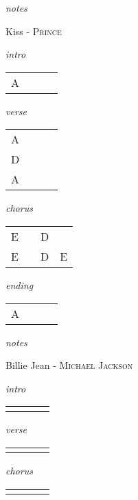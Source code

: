 \documentclass[12pt]{article}
\begin{document}
\textit{notes}

\newpage

{\Huge Kiss} {\huge - \textsc{Prince}}

\huge
\textit{intro}

\begin{tabular}{|P{1.25in}|P{1.25in}|P{1.25in}|P{1.25in}|}
  A &   &   &   \\
\end{tabular}

\textit{verse}

\begin{tabular}{|P{1.25in}|P{1.25in}|P{1.25in}|P{1.25in}|}
  A &   &   &   \\
  D &   &   &   \\
  A &   &   &   \\
\end{tabular}

\textit{chorus}

\begin{tabular}{|P{1.25in}|P{1.25in}|P{1.25in}|P{1.25in}|}
  E &   & D &   \\
  E &   & D & E \\
\end{tabular}

\textit{ending}

\begin{tabular}{|P{1.25in}|P{1.25in}|P{1.25in}|P{1.25in}|}
  A &   &   &   \\
\end{tabular}

\textit{notes}

\newpage

{\Huge Billie Jean} {\huge - \textsc{Michael Jackson}}

\huge
\textit{intro}

\begin{tabular}{|P{1.25in}|P{1.25in}|P{1.25in}|P{1.25in}|}
   &   &   &   \\
\end{tabular}

\textit{verse}

\begin{tabular}{|P{1.25in}|P{1.25in}|P{1.25in}|P{1.25in}|}
    &   &   &   \\
\end{tabular}

\textit{chorus}

\begin{tabular}{|P{1.25in}|P{1.25in}|P{1.25in}|P{1.25in}|}
    &   &   &   \\
\end{tabular}
\end{document}
